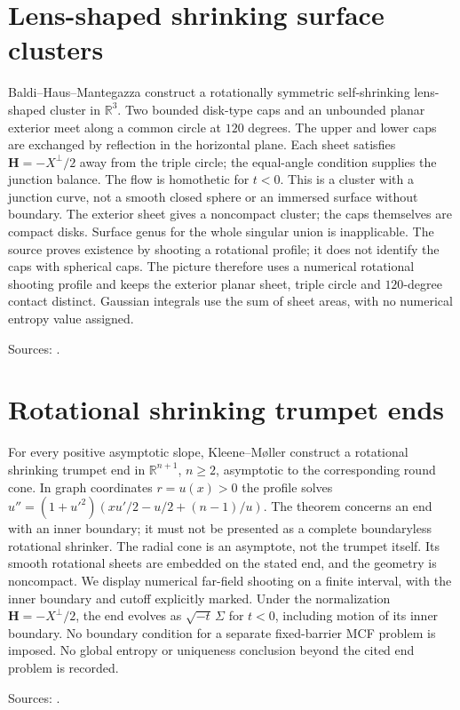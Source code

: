 \chapter{Lens-shaped shrinking surface clusters}\label{sec:catalogue-shrinking-lens-cluster}
\begin{example}\label{ex:catalogue-shrinking-lens-cluster}
Baldi--Haus--Mantegazza construct a rotationally symmetric self-shrinking lens-shaped cluster in $\mathbb R^3$. Two bounded disk-type caps and an unbounded planar exterior meet along a common circle at $120$ degrees. The upper and lower caps are exchanged by reflection in the horizontal plane. Each sheet satisfies $\mathbf H=-X^\perp/2$ away from the triple circle; the equal-angle condition supplies the junction balance.
The flow is homothetic for $t<0$. This is a cluster with a junction curve, not a smooth closed sphere or an immersed surface without boundary. The exterior sheet gives a noncompact cluster; the caps themselves are compact disks. Surface genus for the whole singular union is inapplicable. The source proves existence by shooting a rotational profile; it does not identify the caps with spherical caps. The picture therefore uses a numerical rotational shooting profile and keeps the exterior planar sheet, triple circle and $120$-degree contact distinct. Gaussian integrals use the sum of sheet areas, with no numerical entropy value assigned.
\par Sources: \cite{CatBaldiHausMantegazza2019}.
\end{example}

\chapter{Rotational shrinking trumpet ends}\label{sec:catalogue-rotational-trumpet-ends}
\begin{example}\label{ex:catalogue-rotational-trumpet-ends}
For every positive asymptotic slope, Kleene--Møller construct a rotational shrinking trumpet end in $\mathbb R^{n+1}$, $n\ge2$, asymptotic to the corresponding round cone. In graph coordinates $r=u(x)>0$ the profile solves $u''=(1+u'^2)(xu'/2-u/2+(n-1)/u)$. The theorem concerns an end with an inner boundary; it must not be presented as a complete boundaryless rotational shrinker. The radial cone is an asymptote, not the trumpet itself. Its smooth rotational sheets are embedded on the stated end, and the geometry is noncompact. We display numerical far-field shooting on a finite interval, with the inner boundary and cutoff explicitly marked. Under the normalization $\mathbf H=-X^\perp/2$, the end evolves as $\sqrt{-t}\,\Sigma$ for $t<0$, including motion of its inner boundary. No boundary condition for a separate fixed-barrier MCF problem is imposed. No global entropy or uniqueness conclusion beyond the cited end problem is recorded.
\par Sources: \cite{CatKleeneMoller2014}.
\end{example}

